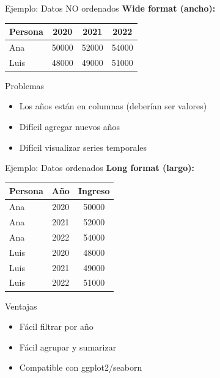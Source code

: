 \documentclass[aspectratio=169]{beamer}
\begin{document}
\begin{frame}{Ejemplo: Datos NO ordenados}
\textbf{Wide format (ancho):}

\begin{center}
\begin{tabular}{|l|c|c|c|}
\hline
\textbf{Persona} & \textbf{2020} & \textbf{2021} & \textbf{2022} \\
\hline
Ana & 50000 & 52000 & 54000 \\
Luis & 48000 & 49000 & 51000 \\
\hline
\end{tabular}
\end{center}

\vspace{0.5em}

\begin{alertblock}{Problemas}
\begin{itemize}
    \item Los años están en columnas (deberían ser valores)
    \item Difícil agregar nuevos años
    \item Difícil visualizar series temporales
\end{itemize}
\end{alertblock}
\end{frame}

\begin{frame}{Ejemplo: Datos ordenados}
\textbf{Long format (largo):}

\begin{center}
\begin{tabular}{|l|c|c|}
\hline
\textbf{Persona} & \textbf{Año} & \textbf{Ingreso} \\
\hline
Ana & 2020 & 50000 \\
Ana & 2021 & 52000 \\
Ana & 2022 & 54000 \\
Luis & 2020 & 48000 \\
Luis & 2021 & 49000 \\
Luis & 2022 & 51000 \\
\hline
\end{tabular}
\end{center}

\vspace{0.5em}

\begin{block}{Ventajas}
\begin{itemize}
    \item Fácil filtrar por año
    \item Fácil agrupar y sumarizar
    \item Compatible con ggplot2/seaborn
\end{itemize}
\end{block}
\end{frame}
\end{document}
